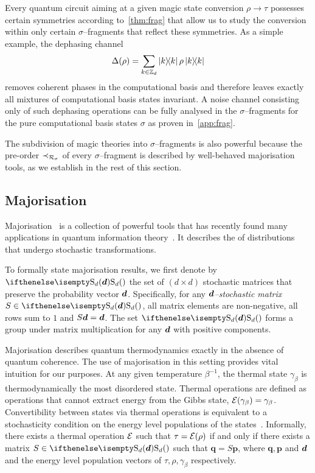 \documentclass[pra,
aps,
twocolumn,
superscriptaddress,
groupedaddress,
nofootinbib,
reprint
]{revtex4-1}
\begin{document}
Every  quantum circuit aiming at a given magic state conversion $\rho \longrightarrow \tau$ possesses certain symmetries according to~\cref{thm:frag} that allow us to study the conversion within only certain $\sigma$--fragments that reflect these symmetries.
As a simple example, the dephasing channel
\begin{equation}\label{eq:dephase}
	\Delta(\rho) = \sum_{k \in \mathbb{Z}_d} \ketbra{k}{k}\rho\ketbra{k}{k}
\end{equation}
removes coherent phases in the computational basis and therefore leaves exactly all mixtures of computational basis states invariant.
A noise channel consisting only of such dephasing operations can be fully analysed in the $\sigma$--fragments for the pure computational basis states $\sigma$ as proven in~\cref{app:frag}.

The subdivision of magic theories into $\sigma$--fragments is also powerful because the pre-order $\prec_{\mathcal{R}_\sigma}$ of every $\sigma$--fragment is described by well-behaved majorisation tools, as we establish in the rest of this section.


\subsection{Majorisation}
\label{sec:major}

Majorisation~\cite{cit:marshall} is a collection of powerful tools that has recently found many applications in quantum information theory~\cite{Nielsen_1999, cit:cwiklinski, cit:lostaglio2, cit:gour, cit:gour2, Horodecki_2003, Vallejos_2021}.
It describes the  of distributions that undergo stochastic transformations.

To formally state majorisation results, we first denote by $\stoch$ the set of $(d \times d)$ stochastic matrices that preserve the probability vector $\bm{d}$.
Specifically, for any \emph{$\bm{d}$--stochastic matrix} $S \in \stoch$, all matrix elements are non-negative, all rows sum to $1$ and $S\bm{d} = \bm{d}$.
The set $\stoch$ forms a group under matrix multiplication for any $\bm{d}$ with positive components.

Majorisation describes quantum thermodynamics exactly in the absence of quantum coherence.
The use of majorisation in this setting provides vital intuition for our purposes.
At any given temperature $\beta^{-1}$, the thermal state $\gamma_\beta$ is thermodynamically the most disordered state. 
Thermal operations are defined as operations that cannot extract energy from the Gibbs state, $\mathcal{E}(\gamma_\beta) = \gamma_\beta$.
Convertibility between states via thermal operations is equivalent to a stochasticity condition on the energy level populations of the states~\cite{cit:lostaglio}.
Informally, there exists a thermal operation $\mathcal{E}$ such that $\tau = \mathcal{E}(\rho)$ if and only if there exists a matrix $S \in \stoch$ such that $\bm{q} = S\bm{p}$, where $\bm{q}, \bm{p}$ and $\bm{d}$ and the energy level population vectors of $\tau, \rho, \gamma_\beta$ respectively.
\end{document}
